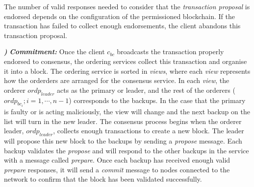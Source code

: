 \documentclass[conference]{llncs}
\newcounter{paranum}
\newcommand{\Par}{\vspace{10pt}\noindent\textbf{\refstepcounter{paranum}\theparanum}\textbf\textit) }
\begin{document}
The number of valid responses needed to consider that the \textit{transaction proposal} is endorsed depends on the configuration of the permissioned blockchain. If the transaction has failed to collect enough endorsements, the client abandons this transaction proposal.

\Par{\textit{\textbf{Commitment:}}} Once the client $c_{bc}$ broadcasts the transaction properly endorsed to consensus, the ordering services collect this transaction and organise it into a block. The ordering service is sorted in \textit{views}, where each \textit{view} represents how the orderders are arranged for the consensus service. In each \textit{view}, the orderer $ordp_{leader}$ acts as the primary or leader, and the rest of the orderers ($ordp_{bc_{i}}; i=1,\cdots,n-1$) corresponds to the backups. In the case that the primary is faulty or is acting maliciously, the view will change and the next backup on the list will turn in the new leader. The consensus process begins when the orderer leader, $ordp_{leader}$, collects enough transactions to create a new block. The leader will propose this new block to the backups by sending a \emph{propose} message. Each backup validates the \emph{propose} and will respond to the other backups in the service with a message called \emph{prepare}. Once each backup has received enough valid \emph{prepare} responses, it will send a \emph{commit} message to nodes connected to the network to confirm that the block has been validated successfully. 
\end{document}
